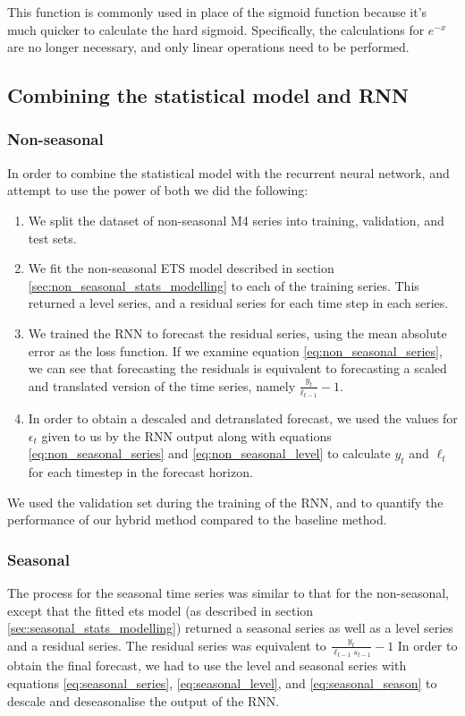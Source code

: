 \documentclass[a4paper,12pt]{article}
\theoremstyle{definition}
\begin{document}
This function is commonly used in place of the sigmoid function because it's much quicker to calculate the hard sigmoid. Specifically, the calculations for $e^{-x}$ are no longer necessary, and only linear operations need to be performed. 

\subsection{Combining the statistical model and RNN}
\subsubsection{Non-seasonal}
In order to combine the statistical model with the recurrent neural network, and attempt to use the power of both we did the following:
\begin{enumerate}
	\item We split the dataset of non-seasonal M4 series into training, validation, and test sets.
	\item We fit the non-seasonal ETS model described in section \ref{sec:non_seasonal_stats_modelling} to each of the training series. This returned a level series, and a residual series for each time step in each series. 
	\item We trained the RNN to forecast the residual series, using the mean absolute error as the loss function. If we examine equation \ref{eq:non_seasonal_series}, we can see that forecasting the residuals is equivalent to forecasting a scaled and translated version of the time series, namely $\frac{y_t}{\ell_{t-1}} - 1$.
	\item In order to obtain a descaled and detranslated forecast, we used the values for $\epsilon_t$ given to us by the RNN output along with equations \ref{eq:non_seasonal_series} and \ref{eq:non_seasonal_level} to calculate $y_t$ and $\ell_t$ for each timestep in the forecast horizon.
\end{enumerate}

We used the validation set during the training of the RNN, and to quantify the performance of our hybrid method compared to the baseline method.

\subsubsection{Seasonal}
The process for the seasonal time series was similar to that for the non-seasonal, except that the fitted ets model (as described in section \ref{sec:seasonal_stats_modelling}) returned a seasonal series as well as a level series and a residual series. The residual series was equivalent to $\frac{y_t}{\ell_{t-1}s_{t-1}} - 1$ In order to obtain the final forecast, we had to use the level and seasonal series with equations \ref{eq:seasonal_series}, \ref{eq:seasonal_level}, and \ref{eq:seasonal_season} to descale and deseasonalise the output of the RNN.
\end{document}
